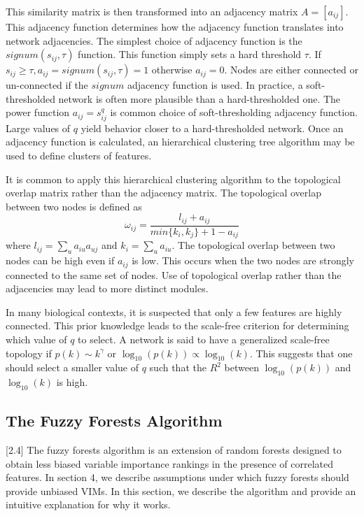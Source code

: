 \documentclass[article,shortnames]{jss}
\begin{document}
This similarity matrix is then transformed into an adjacency matrix $A=[a_{ij}]$.  This adjacency function determines how the adjacency function
translates into network adjacencies.  The simplest choice of adjacency function is the $signum(s_{ij},\tau)$ function.  This function
simply sets a hard threshold $\tau$.  If $s_{ij} \geq \tau, a_{ij}=signum(s_{ij},\tau)=1$ otherwise $a_{ij}=0$.  Nodes are either connected or 
un-connected if the $signum$ adjacency function is used.  In practice, a soft-thresholded network is often more plausible than a 
hard-thresholded one.  The power function $a_{ij}=s_{ij}^{q}$ is common choice of soft-thresholding adjacency function.  Large values
of $q$ yield behavior closer to a hard-thresholded network.  Once an adjacency function is calculated, an hierarchical clustering tree algorithm 
may be used to define clusters of features.

It is common to apply this hierarchical clustering algorithm to the topological overlap matrix rather than the adjacency matrix.  The topological
overlap between two nodes is defined as 
\begin{equation}
\omega_{ij} = \frac{l_{ij} + a_{ij}}{min\{k_{i},k_{j}\} + 1 - a_{ij}}
\end{equation} 
where $l_{ij}=\sum_{u}a_{iu}a_{uj}$ and $k_{i}=\sum_{u}a_{iu}$.  The topological overlap between two nodes can be high even if $a_{ij}$ is low.
This occurs when the two nodes are strongly connected to the same set of nodes.  Use of topological overlap rather
than the adjacencies may lead to more distinct modules.

In many biological contexts, it is suspected that only a few features are highly connected.  This prior knowledge leads to the scale-free criterion for
determining which value of $q$ to select.  A network is said to have a generalized scale-free topology if $p(k) \sim k^{\gamma}$ or
 $\log_{10}(p(k)) \propto \log_{10}(k)$.  This suggests that one should select a smaller value of $q$ such that the $R^{2}$ between 
  $\log_{10}(p(k))$ and $\log_{10}(k)$ is high.
  
  \subsection{The Fuzzy Forests Algorithm}[2.4]
The fuzzy forests algorithm is an extension of random forests designed to obtain less biased variable importance rankings in the presence
of correlated features.  In section 4, we describe assumptions under which fuzzy forests should provide unbiased VIMs.  In this section,
we describe the algorithm and provide an intuitive explanation for why it works.
\end{document}
